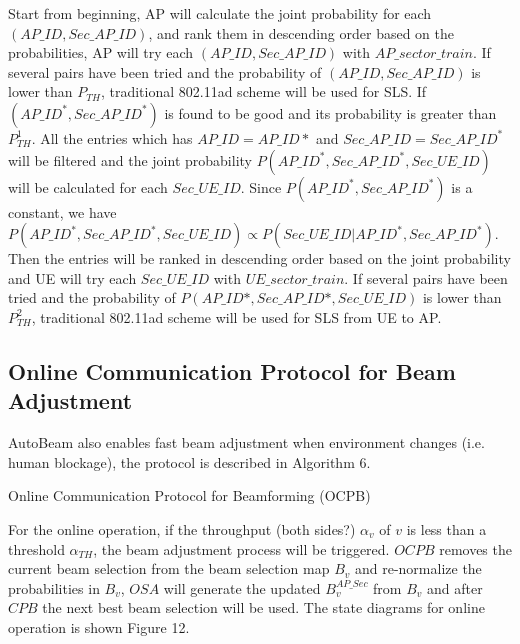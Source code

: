 \documentclass[conference]{IEEEtran}
\begin{document}
Start from beginning, AP will calculate the joint probability for each $(AP\_ID,Sec\_AP\_ID)$, and rank them in descending order based on the probabilities, AP will try each $(AP\_ID,Sec\_AP\_ID)$ with $AP\_sector\_train$. If several pairs have been tried and the probability of $(AP\_ID,Sec\_AP\_ID)$ is lower than $P_{TH}$, traditional 802.11ad scheme will be used for SLS. If $(AP\_ID^{*},Sec\_AP\_ID^{*})$ is found to be good and its probability is greater than $P^{1}_{TH}$. All the entries which has $AP\_ID=AP\_ID*$ and $Sec\_AP\_ID=Sec\_AP\_ID^{*}$ will be filtered and the joint probability $P(AP\_ID^{*},Sec\_AP\_ID^{*},Sec\_UE\_ID)$ will be calculated for each $Sec\_UE\_ID$. Since $P(AP\_ID^{*},Sec\_AP\_ID^{*})$ is a constant, we have $P(AP\_ID^{*},Sec\_AP\_ID^{*},Sec\_UE\_ID)\propto P(Sec\_UE\_ID|AP\_ID^{*},Sec\_AP\_ID^{*})$. Then the entries will be ranked in descending order based on the joint probability and UE will try each $Sec\_UE\_ID$ with $UE\_sector\_train$.  If several pairs have been tried and the probability of $P(AP\_ID*,Sec\_AP\_ID*,Sec\_UE\_ID)$ is lower than $P^{2}_{TH}$, traditional 802.11ad scheme will be used for SLS from UE to AP.  
\subsection{Online Communication Protocol for Beam Adjustment}
AutoBeam also enables fast beam adjustment when environment changes (i.e. human blockage), the protocol is described in Algorithm 6.
\begin{algorithm}[H]	
	\caption{Online Communication Protocol for Beamforming (OCPB)}
\end{algorithm}
For the online operation, if the throughput (both sides?) $\alpha_{v}$ of $v$ is less than a threshold $\alpha_{TH}$, the beam adjustment process will be triggered. $OCPB$ removes the current beam selection from the beam selection map $B_{v}$ and re-normalize the probabilities in $B_{v}$, $OSA$ will generate the updated $B^{AP\_Sec}_{v}$ from $B_{v}$ and after $CPB$ the next best beam selection will be used. The state diagrams for online operation is shown Figure 12.
\end{document}
